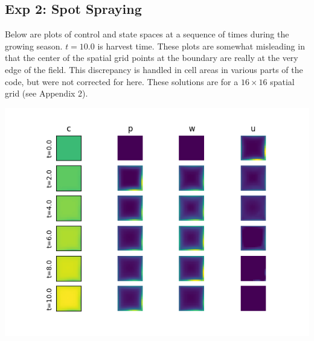\documentclass[11pt]{article}
\begin{document}
\subsection{Exp 2: Spot Spraying}

Below are plots of control and state spaces at a sequence of times during the growing season. $t=10.0$ is harvest time. These plots are somewhat misleading in that the center of the spatial grid points at the boundary are really at the very edge of the field. This discrepancy is handled in cell areas in various parts of the code, but were not corrected for here. These solutions are for a $16 \times 16$ spatial grid (see Appendix 2).

\begin{minipage}{\textwidth}
	\begin{center}
		\includegraphics[width=0.8\linewidth]{../resim_240718-033400/slices.png}
		\vspace{5pt}
	\end{center}
\end{minipage}
\end{document}
